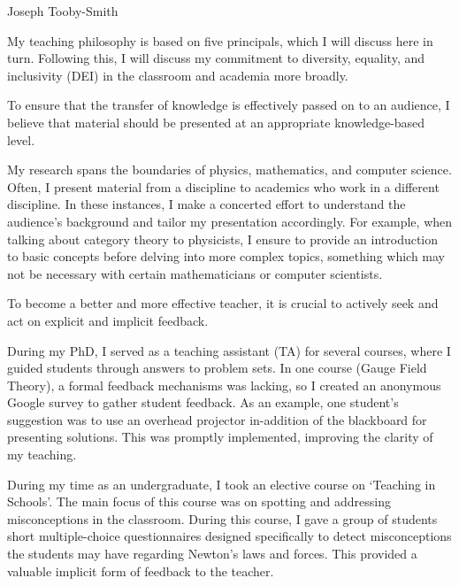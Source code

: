 \documentclass[12pt,letter]{article}
\newcounter{customtitle}
\begin{document}
\vspace{-1cm}
\begin{flushright}
{{\Large \color{white}Joseph Tooby-Smith}}
\end{flushright}
\vspace{0.4cm}

My teaching philosophy is based on five principals, which I will discuss here in turn. Following this, I will discuss my commitment to diversity, equality, and inclusivity (DEI) in the classroom and academia more broadly.
 
 
 To ensure that the transfer of knowledge is effectively passed on to an audience, I believe that material should be presented at an appropriate knowledge-based level. 
 
 My research spans the boundaries of physics, mathematics, and computer science. Often, I present material from a discipline to academics who work in a different discipline. In these instances, I make a concerted effort to understand the audience's background and tailor my presentation accordingly. For example, when talking about category theory to physicists, I ensure to provide an introduction to basic concepts before delving into more complex topics, something which may not be necessary with certain mathematicians or computer scientists.


 To become a better and more effective teacher, it is crucial to actively seek and act on explicit and implicit feedback.
 
 During my PhD, I served as a teaching assistant (TA) for several courses, where I guided students through answers to problem sets. In one course (Gauge Field Theory), a formal feedback mechanisms was lacking, so I created an anonymous Google survey to gather student feedback. As an example, one student's suggestion was to use an overhead projector in-addition of the blackboard for presenting solutions.  This was promptly implemented, improving the clarity of my teaching.
 
 During my time as an undergraduate, I took an elective course on `Teaching in Schools'. The main focus of this course was on spotting and addressing misconceptions in the classroom.  
 During this course, I gave a group of students short multiple-choice questionnaires designed specifically to detect misconceptions the students may have regarding Newton's laws and forces. This provided a valuable implicit form of feedback to the teacher. 
 
\end{document}
